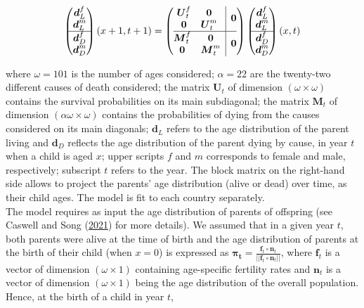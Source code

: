 \documentclass[
  11pt,
  letterpaper,
]{article}
\begin{document}
\[\begin{pmatrix} \boldsymbol{d}^f_L \\ 
\boldsymbol{d}^m_L \\ 
\hline \boldsymbol{d}^f_D \\ 
\boldsymbol{d}^m_D 
\end{pmatrix}(x+1, t+1) = 
\left(\begin{array}{@{}c|c@{}}
  \begin{matrix} 
  \boldsymbol{U}^f_t & \boldsymbol{0} \\ 
  \boldsymbol{0} & \boldsymbol{U}^m_t 
  \end{matrix} & \boldsymbol{0} \\
\hline
\begin{matrix} 
  \boldsymbol{M}^f_t & \boldsymbol{0} \\ 
  \boldsymbol{0} & \boldsymbol{M}^m_t 
  \end{matrix} & \boldsymbol{0} \\
\end{array}\right)
\begin{pmatrix} \boldsymbol{d}^f_L \\ 
\boldsymbol{d}^m_L \\ 
\hline \boldsymbol{d}^f_D \\ 
\boldsymbol{d}^m_D
\end{pmatrix}(x, t)\]

where \(\omega=101\) is the number of ages considered; \(\alpha=22\) are the twenty-two different causes of death considered; the matrix \(\boldsymbol{U}_t\) of dimension \((\omega \times \omega)\) contains the survival probabilities on its main subdiagonal; the matrix \(\boldsymbol{M}_t\) of dimension \((\alpha\omega \times \omega)\) contains the probabilities of dying from the causes considered on its main diagonals; \(\boldsymbol{d}_L\) refers to the age distribution of the parent living and \(\boldsymbol{d}_D\) reflects the age distribution of the parent dying by cause, in year \(t\) when a child is aged \(x\); upper scripts \(f\) and \(m\) corresponds to female and male, respectively; subscript \(t\) refers to the year. The block matrix on the right-hand side allows to project the parents' age distribution (alive or dead) over time, as their child ages. The model is fit to each country separately.\\
The model requires as input the age distribution of parents of offspring (see Caswell and Song (\protect\hyperlink{ref-caswell2021formal}{2021}) for more details). We assumed that in a given year \(t\), both parents were alive at the time of birth and the age distribution of parents at the birth of their child (when \(x=0\)) is expressed as \(\boldsymbol{\pi_t} = \frac{\boldsymbol{f}_t \circ \boldsymbol{n}_t}{||\boldsymbol{f}_t \circ \boldsymbol{n}_t||}\), where \(\boldsymbol{f}_t\) is a vector of dimension \((\omega \times 1)\) containing age-specific fertility rates and \(\boldsymbol{n}_t\) is a vector of dimension \((\omega \times 1)\) being the age distribution of the overall population. Hence, at the birth of a child in year \(t\),
\end{document}
